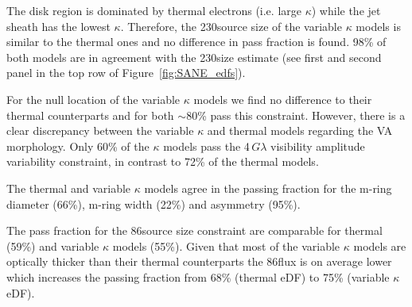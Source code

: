 
The disk region is dominated by thermal electrons (i.e. large $\kappa$) while the jet sheath has the lowest $\kappa$.
Therefore, the 230\GHz source size of the variable $\kappa$ models is similar to the thermal ones and no difference in pass fraction is found.
98\% of both models are in agreement with the 230\GHz size estimate (see first and second panel in the top row of Figure~\ref{fig:SANE_edfs}).


For the null location of the variable $\kappa$ models we find no difference to their thermal counterparts and for both $\sim$80\% pass this constraint.
However, there is a clear discrepancy between the variable $\kappa$ and thermal models regarding the VA morphology.
Only 60\% of the $\kappa$ models pass the 4\,$G\lambda$ visibility amplitude variability constraint, in contrast to 72\% of the thermal models.


The thermal and variable $\kappa$ models agree in the passing fraction for the m-ring diameter (66\%), m-ring width (22\%) and asymmetry (95\%).


The pass fraction for the 86\GHz source size constraint are comparable for thermal (59\%) and variable $\kappa$ models (55\%).
Given that most of the variable $\kappa$ models are optically thicker than their thermal counterparts the 86\GHz flux is on average lower which increases the passing fraction from 68\% (thermal eDF) to 75\% (variable $\kappa$ eDF).


